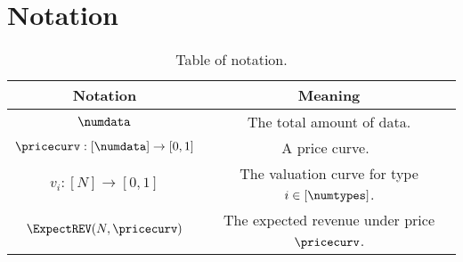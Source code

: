 \section{Notation}


\begin{table}[ht]

    \centering
    \renewcommand{\arraystretch}{1.5}
    \begin{tabular}{|c|c|}
        \hline
        Notation & Meaning \\
        \hline
        $\numdata$ & The total amount of data. \\ \hline
        $\pricecurv:[\numdata]\rightarrow[0,1]$ & A price curve.\ \\ \hline
        $v_i:[N]\rightarrow [0,1]$ & The valuation curve for type $i\in[\numtypes]$. \\ \hline
        $\ExpectREV (N,\pricecurv)$ & The expected revenue under price $\pricecurv$.\\ \hline
        
    \end{tabular}
    \vspace{0.5em}
    \caption{Table of notation.}
    \label{tab:notations}
\end{table}